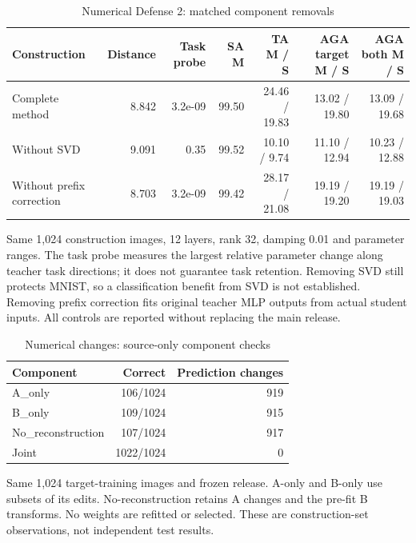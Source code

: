 \begin{table}[!htbp]
\centering
\small
\caption{Numerical Defense 2: matched component removals}
\label{tab:numerical_ablation}
\begin{tabular}{lrrrrrr}
\toprule
Construction & Distance & Task probe & SA M & TA M / S & AGA target M / S & AGA both M / S \\
\midrule
Complete method & 8.842 & 3.2e-09 & 99.50 & 24.46 / 19.83 & 13.02 / 19.80 & 13.09 / 19.68 \\
Without SVD & 9.091 & 0.35 & 99.52 & 10.10 / 9.74 & 11.10 / 12.94 & 10.23 / 12.88 \\
Without prefix correction & 8.703 & 3.2e-09 & 99.42 & 28.17 / 21.08 & 19.19 / 19.20 & 19.19 / 19.03 \\
\bottomrule
\end{tabular}
\par\vspace{3pt}\begin{minipage}{0.98\linewidth}\footnotesize Same 1,024 construction images, 12 layers, rank 32, damping 0.01 and parameter ranges. The task probe measures the largest relative parameter change along teacher task directions; it does not guarantee task retention. Removing SVD still protects MNIST, so a classification benefit from SVD is not established. Removing prefix correction fits original teacher MLP outputs from actual student inputs. All controls are reported without replacing the main release.\end{minipage}
\end{table}

\begin{table}[!htbp]
\centering
\small
\caption{Numerical changes: source-only component checks}
\label{tab:numerical_components}
\begin{tabular}{lrr}
\toprule
Component & Correct & Prediction changes \\
\midrule
A\_only & 106/1024 & 919 \\
B\_only & 109/1024 & 915 \\
No\_reconstruction & 107/1024 & 917 \\
Joint & 1022/1024 & 0 \\
\bottomrule
\end{tabular}
\par\vspace{3pt}\begin{minipage}{0.98\linewidth}\footnotesize Same 1,024 target-training images and frozen release. A-only and B-only use subsets of its edits. No-reconstruction retains A changes and the pre-fit B transforms. No weights are refitted or selected. These are construction-set observations, not independent test results.\end{minipage}
\end{table}

